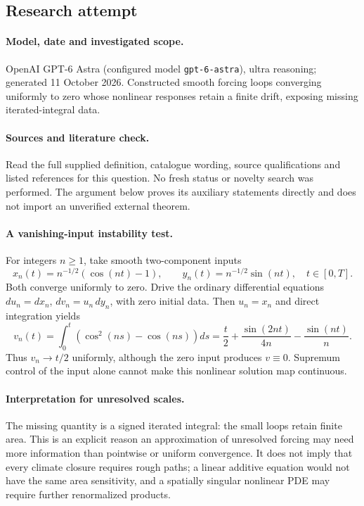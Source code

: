 \documentclass[11pt]{article}
\begin{document}
\subsection{Research attempt}
\paragraph{Model, date and investigated scope.}
OpenAI GPT-6 Astra (configured model \texttt{gpt-6-astra}), ultra reasoning; generated 11 October 2026. Constructed smooth forcing loops converging uniformly to zero whose nonlinear responses retain a finite drift, exposing missing iterated-integral data.

\paragraph{Sources and literature check.}
Read the full supplied definition, catalogue wording, source qualifications and listed references for this question. No fresh status or novelty search was performed. The argument below proves its auxiliary statements directly and does not import an unverified external theorem.

\paragraph{A vanishing-input instability test.} For integers \(n\geq1\), take smooth two-component inputs
\[
 x_n(t)=n^{-1/2}(\cos(nt)-1),\qquad y_n(t)=n^{-1/2}\sin(nt),\quad t\in[0,T].
\]
Both converge uniformly to zero. Drive the ordinary differential equations \(du_n=dx_n\), \(dv_n=u_n\,dy_n\), with zero initial data. Then \(u_n=x_n\) and direct integration yields
\[
 v_n(t)=\int_0^t(\cos^2(ns)-\cos(ns))ds
 =\frac t2+\frac{\sin(2nt)}{4n}-\frac{\sin(nt)}n.
\]
Thus \(v_n\to t/2\) uniformly, although the zero input produces \(v\equiv0\). Supremum control of the input alone cannot make this nonlinear solution map continuous.
\paragraph{Interpretation for unresolved scales.} The missing quantity is a signed iterated integral: the small loops retain finite area. This is an explicit reason an approximation of unresolved forcing may need more information than pointwise or uniform convergence. It does not imply that every climate closure requires rough paths; a linear additive equation would not have the same area sensitivity, and a spatially singular nonlinear PDE may require further renormalized products.
\end{document}
